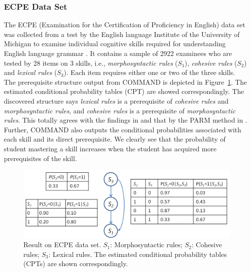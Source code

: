 \documentclass{edm_template}
\begin{document}
	\subsubsection{ECPE Data Set}
	The ECPE (Examination for the Certification of Proficiency in English) data set was collected from a test by the English language Institute
	of the University of Michigan to examine individual cognitive skills required for understanding English language grammar \cite{templin2014hierarchical}.
	It contains a sample of 2922 examinees who are tested by 28 items on 3 skills, i.e., \emph{morphosyntactic rules} ($S_1$), \emph{cohesive rules} ($S_2$) 
	and \emph{lexical rules} ($S_3$). Each item requires either one or two of the three skills. 
	The prerequisite structure output from COMMAND is depicted in Figure~\ref{fig:ecpe-result}. The estimated conditional probability tables (CPT) are showed correspondingly.
	The discovered structure says \emph{lexical rules} is a prerequisite of \emph{cohesive rules} and \emph{morphosyntactic rules}, 
	and \emph{cohesive rules} is a prerequisite of \emph{morphosyntactic rules}. 
	This totally agrees with the findings in \cite{templin2014hierarchical} and that by the PARM method in \cite{chen2015discovering}.
	Further, COMMAND also outputs the conditional probabilities associated with each skill and its direct prerequisite.
	We clearly see that the probability of student mastering a skill increases when the student has acquired more prerequisites of the skill.
	
			\begin{figure}[!th]
				\begin{center}
					\centering
					\includegraphics[width=1.0\linewidth]{figures/ecpe_results.png}
				\end{center}
				\caption{Result on ECPE data set. $S_1$: Morphosyntactic rules; $S_2$: Cohesive rules; $S_3$: Lexical rules. 
					The estimated conditional probability tables (CPTs) are shown correspondingly.}
				\label{fig:ecpe-result} 
			\end{figure}
	
\end{document}
